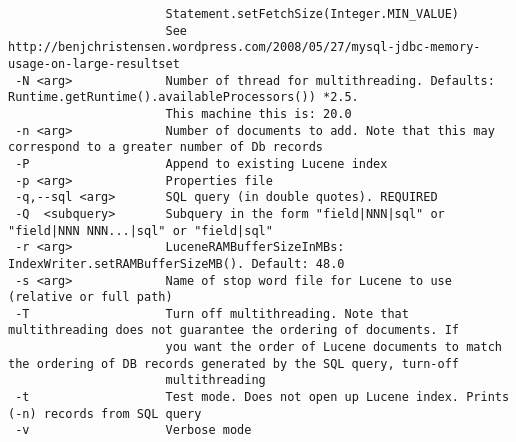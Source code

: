 \begin{verbatim}
                      Statement.setFetchSize(Integer.MIN_VALUE)
                      See http://benjchristensen.wordpress.com/2008/05/27/mysql-jdbc-memory-usage-on-large-resultset
 -N <arg>             Number of thread for multithreading. Defaults: Runtime.getRuntime().availableProcessors()) *2.5.
                      This machine this is: 20.0
 -n <arg>             Number of documents to add. Note that this may correspond to a greater number of Db records
 -P                   Append to existing Lucene index
 -p <arg>             Properties file
 -q,--sql <arg>       SQL query (in double quotes). REQUIRED
 -Q  <subquery>       Subquery in the form "field|NNN|sql" or "field|NNN NNN...|sql" or "field|sql"
 -r <arg>             LuceneRAMBufferSizeInMBs: IndexWriter.setRAMBufferSizeMB(). Default: 48.0
 -s <arg>             Name of stop word file for Lucene to use (relative or full path)
 -T                   Turn off multithreading. Note that multithreading does not guarantee the ordering of documents. If
                      you want the order of Lucene documents to match the ordering of DB records generated by the SQL query, turn-off
                      multithreading
 -t                   Test mode. Does not open up Lucene index. Prints (-n) records from SQL query
 -v                   Verbose mode
\end{verbatim}